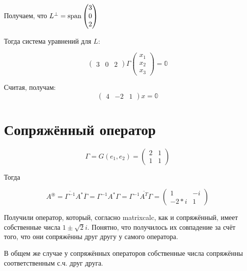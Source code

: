 \documentclass[12pt, a4paper]{article}
\begin{document}
    Получаем, что $L^{\perp} = \operatorname{span} \begin{pmatrix}
        3 \\ 0 \\ 2
    \end{pmatrix}$

    Тогда система уравнений для $L$:

    \begin{equation}
        \begin{pmatrix}
            3 & 0 & 2
        \end{pmatrix} \Gamma \begin{pmatrix}
            x_1 \\ x_2 \\ x_3
        \end{pmatrix} = \mathbb{0}
    \end{equation}
    
    Считая, получам:
    \begin{equation}
        \begin{pmatrix}
            4 & -2 & 1
        \end{pmatrix} x = \mathbb{0}
    \end{equation}


    \section{Сопряжённый оператор}

    \begin{equation}
        \Gamma = G(e_1, e_2) = \begin{pmatrix}
            2 & 1 \\
            1 & 1
        \end{pmatrix}
    \end{equation}
    
    Тогда
    
    \begin{equation}
        A^{\circledast} = \overline{\Gamma^{-1}}A^{*}\overline{\Gamma} 
        = \Gamma^{-1}A^{*}\Gamma = \Gamma^{-1}\overline{A^{T}}\Gamma = \left(\begin{matrix}
            1 & -i \\
            -2*i & 1
        \end{matrix}\right)
    \end{equation}

    Получили оператор, который, согласно matrixcalc, как и сопряжённый, имеет собственные числа 
    $1 \pm \sqrt{2}i$. Понятно, что получилось их совпадение за счёт того, что они сопряжённы друг другу у самого оператора.

    В общем же случае у сопряжённых операторов собственные числа сопряжённы соответственным с.ч. друг друга. 
\end{document}
